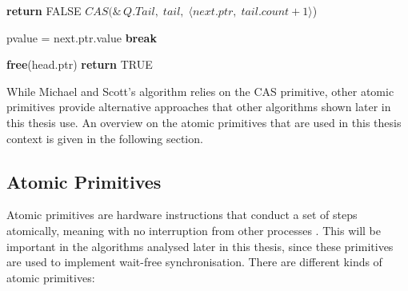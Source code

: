 \begin{algorithm}[!ht]
\begin{algorithmic}[1]
                        \State \textbf{return} FALSE
                    \Else
                        \State 
                        $CAS(\&\,Q.Tail,\; tail,\; \langle next.ptr,\; tail.count+1\rangle$)
                    \EndIf
    
                \Else
                    \State *pvalue = next.ptr.value
                        \State \textbf{break}
                    \EndIf
                \EndIf
            \EndIf
        \EndLoop
    
        \State \textbf{free}(head.ptr)
        \State \textbf{return} TRUE
    
    \EndFunction
    
    \end{algorithmic}
    \cite{MichaelScottQueue}
\end{algorithm} 

While Michael and Scott's algorithm relies on the \ac{CAS} primitive, other atomic primitives provide alternative approaches that other algorithms shown later in this thesis use. An overview on the atomic primitives that are used in this thesis context is given in the following section.

\subsection{Atomic Primitives}\label{subsec:atomic-primitives}
Atomic primitives are hardware instructions that conduct a set of steps atomically, meaning with no interruption from other processes \cite{Atomics}. This will be important in the algorithms analysed later in this thesis, since these primitives are used to implement wait-free synchronisation. There are different kinds of atomic primitives: 

